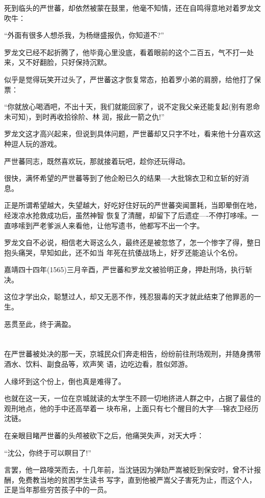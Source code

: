\documentclass[11pt,a4paper,onecolumn]{article}
\begin{document}
死到临头的严世蕃，却依然被蒙在鼓里，他毫不知情，还在自鸣得意地对着罗龙文吹牛：

``外面有很多人想杀我，为杨继盛报仇，你知道不?''

罗龙文已经不起折腾了，他毕竟心里没底，看着眼前的这个二百五，气不打一处来，又不好翻脸，只好保持沉默。

似乎是觉得玩笑开过头了，严世蕃这才恢复常态，拍着罗小弟的肩膀，给他打了保票：

``你就放心喝酒吧，不出十天，我们就能回家了，说不定我父亲还能复起(别有恩命未可知)，到时再收拾徐阶、林
润，报此一箭之仇!''

罗龙文这才高兴起来，但说到具体问题，严世蕃却又只字不吐，看来他十分喜欢这种逗人玩的游戏。

严世蕃同志，既然喜欢玩，那就接着玩吧，趁你还玩得动。

很快，满怀希望的严世蕃等到了他企盼已久的结果----大批锦衣卫和立斩的好消息。

正是所谓希望越大，失望越大，好吃好住好玩的严世蕃突闻噩耗，当即晕倒在地，经泼凉水抢救成功后，虽然神智
恢复了清醒，却留下了后遗症----不停打哆嗦。一直哆嗦到严老爹派人来看他，让他写遗书，他都写不出一个字。

罗龙文自不必说，相信老大哥这么久，最终还是被忽悠了，怎一个惨字了得，整日抱头痛哭，早知如此，还不如当
年死在抗倭战场上，好歹还能追认个名份。

嘉靖四十四年(1565)三月辛酉，严世蕃和罗龙文被验明正身，押赴刑场，执行斩决。

这位才学出众，聪慧过人，却又无恶不作，残忍狠毒的天才就此结束了他罪恶的一生。

恶贯至此，终于满盈。

\section[\thesection]{}

在严世蕃被处决的那一天，京城民众们奔走相告，纷纷前往刑场观刑，并随身携带酒水、饮料、副食品等，欢声笑
语，边吃边看，胜似郊游。

人缘坏到这个份上，倒也真是难得了。

也就在这一天，一位在京城就读的太学生不顾一切地挤进人群之中，占据了最佳的观刑地点，他的手中还高举着一
块布帛，上面只有七个醒目的大字----锦衣卫经历沈链。

在亲眼目睹严世蕃的头颅被砍下之后，他痛哭失声，对天大呼：

``沈公，你终于可以瞑目了!''

言罢，他一路嚎哭而去，十几年前，当沈链因为弹劾严嵩被贬到保安时，曾不计报酬，免费教当地的贫困学生读书
写字，直到他被严嵩父子害死为止，而这个人，正是当年那些穷苦孩子中的一员。
\end{document}
